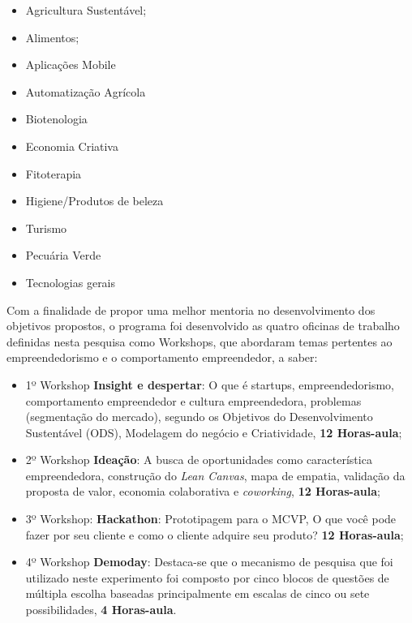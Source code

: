 \begin{multicols}{2}
\centering
    \begin{itemize}
    \item{Agricultura Sustentável;}
    \item{Alimentos;}
    \item{Aplicações Mobile}
    \item{Automatização Agrícola}
    \item{Biotenologia}
    \item{Economia Criativa}
    \item{Fitoterapia}
    \item{Higiene/Produtos de beleza}
    \item{Turismo}
    \item{Pecuária Verde}
    \item{Tecnologias gerais}
\end{itemize}
\end{multicols}


Com a finalidade de propor uma melhor mentoria no desenvolvimento dos objetivos propostos, o programa foi desenvolvido as quatro oficinas de trabalho definidas nesta pesquisa como  Workshops, que abordaram temas pertentes ao empreendedorismo e o comportamento empreendedor, a saber:

\begin{itemize}

\item {1º Workshop \textbf{Insight e despertar}: O que é startups, empreendedorismo, comportamento empreendedor e cultura empreendedora, problemas (segmentação do mercado), segundo os Objetivos do Desenvolvimento Sustentável (ODS), Modelagem do negócio e Criatividade, \textbf{12 Horas-aula};}

\item {2º Workshop \textbf{Ideação}: A busca de oportunidades como característica empreendedora, construção do \textit{\textit{Lean Canvas}}, mapa de empatia, validação da proposta de valor, economia colaborativa e \textit{coworking}, \textbf{12 Horas-aula};}

\item {3º Workshop: \textbf{Hackathon}: Prototipagem para o MCVP, O que você pode fazer por seu cliente e como o cliente adquire seu produto? \textbf{12 Horas-aula};}

\item {4º Workshop \textbf{Demoday}: Destaca-se que o mecanismo de pesquisa que foi utilizado neste experimento foi composto por cinco blocos de questões de múltipla escolha baseadas principalmente em escalas de cinco ou sete possibilidades, \textbf{4 Horas-aula}.}
\end{itemize}

